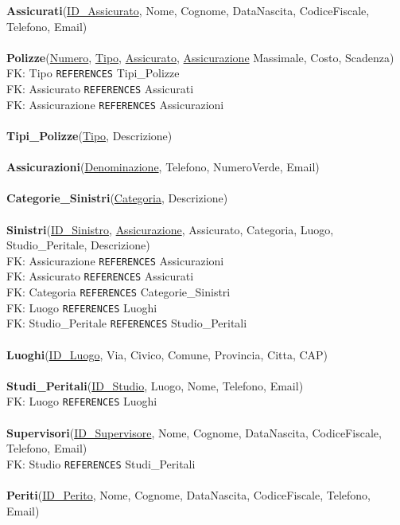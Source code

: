 \documentclass[a4paper,12pt]{report}
\begin{document}
\textbf{Assicurati}(\underline{ID\_Assicurato}, Nome, Cognome, DataNascita, CodiceFiscale, Telefono, Email)
\\
\\
\textbf{Polizze}(\underline{Numero}, \underline{Tipo}, \underline{Assicurato}, \underline{Assicurazione} Massimale, Costo, Scadenza) \\
FK: Tipo \texttt{REFERENCES} Tipi\_Polizze  \\
FK: Assicurato \texttt{REFERENCES} Assicurati \\
FK: Assicurazione \texttt{REFERENCES} Assicurazioni \\
\\
\textbf{Tipi\_Polizze}(\underline{Tipo}, Descrizione)
\\
\\
\textbf{Assicurazioni}(\underline{Denominazione}, Telefono, NumeroVerde, Email) \\
\\
\textbf{Categorie\_Sinistri}(\underline{Categoria}, Descrizione) \\
\\
\textbf{Sinistri}(\underline{ID\_Sinistro}, \underline{Assicurazione}, Assicurato, Categoria, Luogo, Studio\_Peritale, Descrizione) \\
FK: Assicurazione \texttt{REFERENCES} Assicurazioni \\
FK: Assicurato \texttt{REFERENCES} Assicurati \\
FK: Categoria \texttt{REFERENCES} Categorie\_Sinistri  \\
FK: Luogo \texttt{REFERENCES} Luoghi \\
FK: Studio\_Peritale \texttt{REFERENCES} Studio\_Peritali \\
\\
\textbf{Luoghi}(\underline{ID\_Luogo}, Via, Civico, Comune, Provincia, Citta, CAP) \\
\\
\textbf{Studi\_Peritali}(\underline{ID\_Studio}, Luogo, Nome, Telefono, Email) \\
FK: Luogo \texttt{REFERENCES} Luoghi \\
\\
\textbf{Supervisori}(\underline{ID\_Supervisore}, Nome, Cognome, DataNascita, CodiceFiscale, Telefono, Email) \\
FK: Studio \texttt{REFERENCES} Studi\_Peritali \\
\\
\textbf{Periti}(\underline{ID\_Perito}, Nome, Cognome, DataNascita, CodiceFiscale, Telefono, Email) \\
\end{document}
